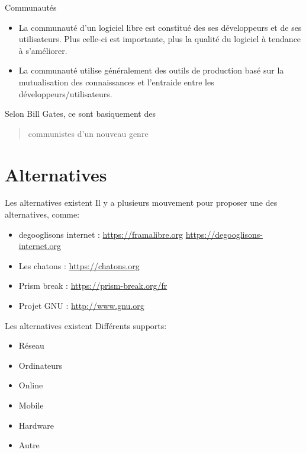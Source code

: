 \documentclass{beamer}
\begin{document}
\begin{frame}{Communautés}
\begin{itemize}
    \item La communauté d'un logiciel libre est constitué des ses développeurs et de ses utilisateurs. Plus celle-ci est importante, plus la qualité du logiciel à tendance à s'améliorer.
    \item La communauté utilise généralement des outils de production basé sur la mutualisation des connaissances et l'entraide entre les développeurs/utilisateurs.
 \end{itemize}
 Selon Bill Gates, ce sont basiquement des \begin{quote}{communistes d'un nouveau genre}\end{quote}
\end{frame}





\section{Alternatives}
\begin{frame}{Les alternatives existent}
Il y a plusieurs mouvement pour proposer une des alternatives, comme:
\begin{itemize}
	\item degooglisons internet : \url{https://framalibre.org} \url{https://degooglisons-internet.org}
	\item Les chatons : \url{https://chatons.org}
	\item Prism break : \url{https://prism-break.org/fr}
	\item Projet GNU : \url{http://www.gnu.org}
\end{itemize}
\end{frame}

\begin{frame}{Les alternatives existent}
Différents supports:
\begin{itemize}
	\item Réseau
	\item Ordinateurs
	\item Online
	\item Mobile
	\item Hardware
	\item Autre
\end{itemize}
\end{frame}
\end{document}
